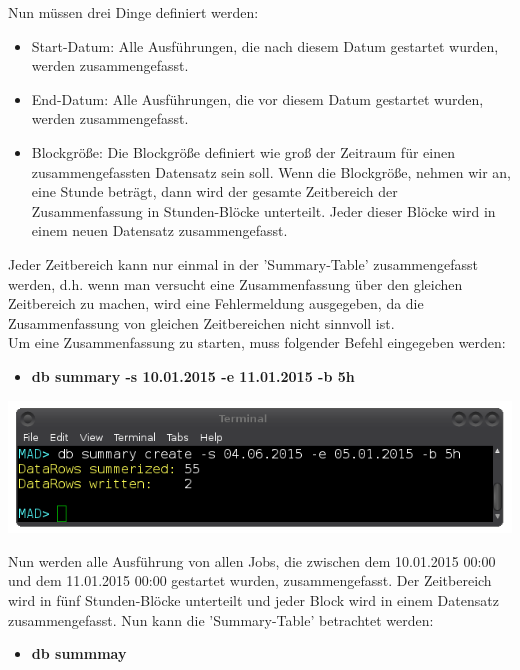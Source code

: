 \documentclass[12pt,a4paper]{report}
\begin{document}
\begin{onehalfspace}
Nun müssen drei Dinge definiert werden:

\begin{itemize}
\item Start-Datum: Alle Ausführungen, die nach diesem Datum gestartet wurden, werden zusammengefasst.
\item End-Datum: Alle Ausführungen, die vor diesem Datum gestartet wurden, werden zusammengefasst.
\item Blockgröße: Die Blockgröße definiert wie groß der Zeitraum für einen zusammengefassten Datensatz sein soll. Wenn die Blockgröße, nehmen wir an, eine Stunde beträgt, dann wird der gesamte Zeitbereich der Zusammenfassung in Stunden-Blöcke unterteilt. Jeder dieser Blöcke wird in einem neuen Datensatz zusammengefasst.
\end{itemize}

Jeder Zeitbereich kann nur einmal in der 'Summary-Table' zusammengefasst werden, d.h. wenn man versucht eine Zusammenfassung über den gleichen Zeitbereich zu machen, wird eine Fehlermeldung ausgegeben, da die Zusammenfassung von gleichen Zeitbereichen nicht sinnvoll ist.\\

Um eine Zusammenfassung zu starten, muss folgender Befehl eingegeben werden:

\begin{itemize}
\item \textbf{db summary -s 10.01.2015 -e 11.01.2015 -b 5h}
\end{itemize}

\begin{center}
\includegraphics[scale=0.5]{img/db_summary_create.png}
\end{center}

Nun werden alle Ausführung von allen Jobs, die zwischen dem 10.01.2015 00:00 und dem 11.01.2015 00:00 gestartet wurden, zusammengefasst. Der Zeitbereich wird in fünf Stunden-Blöcke unterteilt und jeder Block wird in einem Datensatz zusammengefasst. Nun kann die 'Summary-Table' betrachtet werden:\\

\begin{itemize}
\item \textbf{db summmay}
\end{itemize}


\end{onehalfspace}
\end{document}
